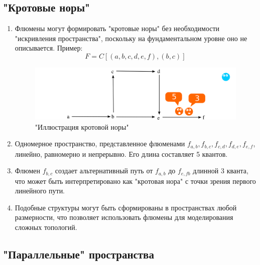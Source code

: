 \documentclass[final]{article}
\begin{document}
        \subsection{"Кротовые норы"}

            \begin{enumerate}

                \item Флюмены могут формировать "кротовые норы" без необходимости 
                "искривления пространства", поскольку на фундаментальном уровне оно 
                не описывается. Пример: \[ F = C[(a,b,c,d,e,f),(b,c)] 
                \]

                \begin{figure}[H]
                    \centering
                    \includegraphics[width=\textwidth]{./wormhole.png}
                    \caption{"Иллюстрация кротовой норы"}
                    \label{fig:image}
                \end{figure}

                \item Одномерное пространство, представленное флюменами \(f_{a,b}, 
                f_{b,c}, f_{c,d}, f_{d,e}, f_{e,f}\), линейно, равномерно и 
                непрерывно. Его длина составляет 5 квантов.

                \item Флюмен \( f_{b,c} \) создает альтернативный путь от 
                \(f_{a,b}\) до \(f_{e,fb}\) длинной 3 кванта, что может быть 
                интерпретировано как "кротовая нора" с точки зрения первого 
                линейного пути.

                \item Подобные структуры могут быть сформированы в пространствах любой 
                размерности, что позволяет использовать флюмены для моделирования сложных 
                топологий.

            \end{enumerate}



        \subsection{"Параллельные" пространства}
\end{document}
